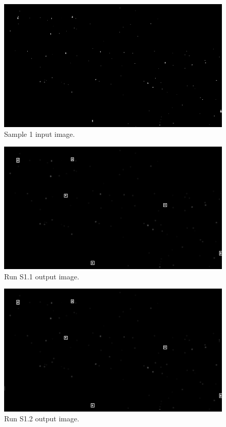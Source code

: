 \documentclass[12pt]{report}
\begin{document}
\begin{figure}[h]
    \centering
    \includegraphics[scale=0.7]{results/s0_in.png}
    \caption{Sample 1 input image.}
    \label{res:s0_in}
\end{figure}
\begin{figure}[h]
    \centering
    \includegraphics[scale=1.2]{results/s0_1.png}
    \caption{Run S1.1 output image.}
    \label{res:s0_1}
\end{figure}
\begin{figure}[h]
    \centering
    \includegraphics[scale=1.2]{results/s0_2.png}
    \caption{Run S1.2 output image.}
    \label{res:s0_2}
\end{figure}
\end{document}
